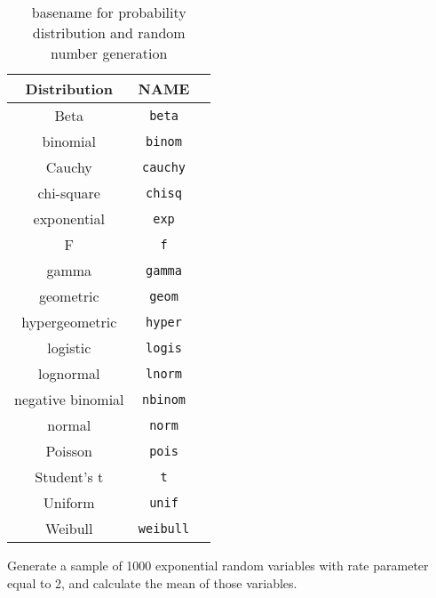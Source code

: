 \begin{table}
\begin{center}
\caption{basename for probability distribution and random number generation}
\label{core:dist}
\begin{tabular}{|c|c|c|} \hline
Distribution   & NAME                 \\ \hline
Beta           &  {\tt beta}        \\
binomial       &  {\tt binom}    \\
Cauchy         &  {\tt cauchy}   \\
chi-square     &  {\tt chisq}    \\
exponential    &  {\tt exp}      \\
F              &  {\tt f}        \\
gamma          &  {\tt gamma}    \\
geometric      &  {\tt geom}     \\
hypergeometric &  {\tt hyper}    \\
logistic       &  {\tt logis}    \\
lognormal      &  {\tt lnorm}    \\
negative binomial &  {\tt nbinom} \\
normal         &  {\tt norm}      \\
Poisson        &  {\tt pois}      \\
Student's t    &  {\tt t}        \\
Uniform        &  {\tt unif}     \\
Weibull        &  {\tt weibull}   \\ \hline
\end{tabular}
\end{center}
\end{table}

\begin{problem}
Generate a sample of 1000 exponential random variables with rate parameter
equal to 2, and calculate the mean of those variables.
\end{problem}
\begin{solution}
\begin{knitrout}
\end{knitrout}

\end{solution}


